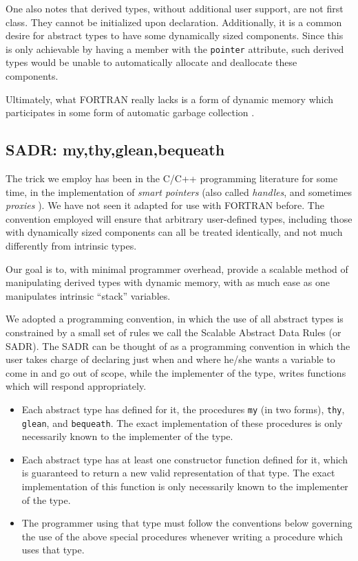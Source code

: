 One also notes that derived types, without additional user
support, are not first class.  They cannot be initialized upon
declaration.  Additionally, it is a common desire for abstract types
to have some dynamically sized components.  Since this is only
achievable by having a member with the \verb+pointer+ attribute, such
derived types would be unable to automatically allocate and deallocate
these components.

Ultimately, what FORTRAN really lacks is a form of dynamic memory
which participates in some form of automatic garbage collection
\cite{Wilson.GCSurvey}.

\subsection{SADR: my,thy,glean,bequeath}

The trick we employ has been in the C/C++ programming literature for
some time, in the implementation of {\em smart pointers} (also called
{\em handles}, and sometimes {\em proxies} 
\cite{designpattterns,Coplien.AdvancedCPPIdioms}).
We have not seen it adapted for use with FORTRAN before.  The
convention employed will ensure that arbitrary user-defined types,
including those with dynamically sized components can all be treated
identically, and not much differently from intrinsic types.

Our goal is to, with minimal programmer overhead, provide a scalable
method of manipulating derived types with dynamic memory, with as much
ease as one manipulates intrinsic ``stack'' variables.

We adopted a programming convention, in which the use of all abstract
types is constrained by a small set of rules we call the {Scalable
Abstract Data Rules} (or SADR).  The SADR can be thought of as a
programming convention in which the user takes charge of
declaring just when and where he/she wants a variable to come in and
go out of scope, while the implementer of the type, writes functions
which will respond appropriately.

\begin{itemize}

\item Each abstract type has defined for it, the procedures
\verb+my+ (in two forms), \verb+thy+, \verb+glean+, and \verb+bequeath+.
The exact implementation of these procedures is only necessarily known
to the implementer of the type.

\item Each abstract type has at least one constructor function defined
for it, which is guaranteed to return a new valid representation of that
type.  The exact implementation of this function is only necessarily known
to the implementer of the type.

\item The programmer using that type must follow the conventions below
governing the use of the above special procedures whenever writing a
procedure which uses that type.

\end{itemize}

